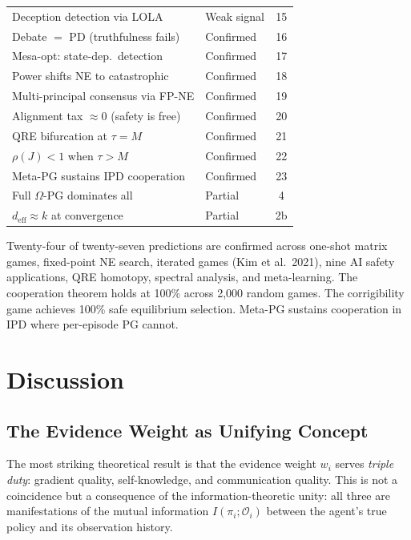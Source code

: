\documentclass[11pt,a4paper]{article}
\begin{document}
\begin{center}
\begin{tabular}{llc}
Deception detection via LOLA & \textcolor{cOrange}{Weak signal} & 15 \\
Debate $=$ PD (truthfulness fails) & \textcolor{cGreen}{Confirmed} & 16 \\
Mesa-opt: state-dep.\ detection & \textcolor{cGreen}{Confirmed} & 17 \\
Power shifts NE to catastrophic & \textcolor{cGreen}{Confirmed} & 18 \\
Multi-principal consensus via FP-NE & \textcolor{cGreen}{Confirmed} & 19 \\
Alignment tax $\approx 0$ (safety is free) & \textcolor{cGreen}{Confirmed} & 20 \\
QRE bifurcation at $\tau = M$ & \textcolor{cGreen}{Confirmed} & 21 \\
$\rho(J) < 1$ when $\tau > M$ & \textcolor{cGreen}{Confirmed} & 22 \\
Meta-PG sustains IPD cooperation & \textcolor{cGreen}{Confirmed} & 23 \\
Full $\Omega$-PG dominates all & \textcolor{cOrange}{Partial} & 4 \\
$d_{\text{eff}} \approx k$ at convergence & \textcolor{cOrange}{Partial} & 2b \\
\bottomrule
\end{tabular}
\end{center}

Twenty-four of twenty-seven predictions are confirmed across one-shot
matrix games, fixed-point NE search, iterated games (Kim et al.\ 2021),
nine AI safety applications, QRE homotopy, spectral analysis, and
meta-learning. The cooperation theorem holds at 100\% across 2,000
random games. The corrigibility game achieves 100\% safe equilibrium
selection. Meta-PG sustains cooperation in IPD where per-episode PG
cannot.


\section{Discussion}

\subsection{The Evidence Weight as Unifying Concept}

The most striking theoretical result is that the evidence weight $w_i$
serves \emph{triple duty}: gradient quality, self-knowledge, and
communication quality. This is not a coincidence but a consequence of
the information-theoretic unity: all three are manifestations of the
mutual information $I(\pi_i; \mathcal{O}_i)$ between the agent's
true policy and its observation history.
\end{document}
